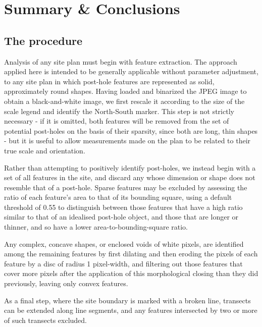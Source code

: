 \documentclass[../../ArchStats.tex]{subfiles}
\begin{document}
\section{Summary \& Conclusions}

\subsection{The procedure}

Analysis of any site plan must begin with feature extraction. The approach applied here is intended to be generally applicable without parameter adjustment, to any site plan in which post-hole features are represented as solid, approximately round shapes. Having loaded and binarized the JPEG image to obtain a black-and-white image, we first rescale it according to the size of the scale legend and identify the North-South marker. This step is not strictly necessary - if it is omitted, both features will be removed from the set of potential post-holes on the basis of their sparsity, since both are long, thin shapes - but it is useful to allow measurements made on the plan to be related to their true scale and orientation. 

Rather than attempting to positively identify post-holes, we instead begin with a set of all features in the site, and discard any whose dimension or shape does not resemble that of a  post-hole. 
Sparse features may be excluded by assessing the ratio of each feature's area to that of its bounding square, using a default threshold of 0.55 to distinguish between those features that have a high ratio similar to that of an idealised post-hole object, and those   that are  longer or thinner, and so have a lower area-to-bounding-square ratio. 

Any complex, concave shapes, or enclosed voids of white pixels, are identified among the remaining features by first dilating and then eroding the pixels of each feature by a disc of radius 1 pixel-width, and filtering out those features that cover more pixels after the application of this morphological closing than they did previously, leaving only convex features. %

As a final step, where the site boundary is marked with a broken line, transects can be extended along line segments, and any features intersected by two or more of such  transects excluded.
\end{document}
